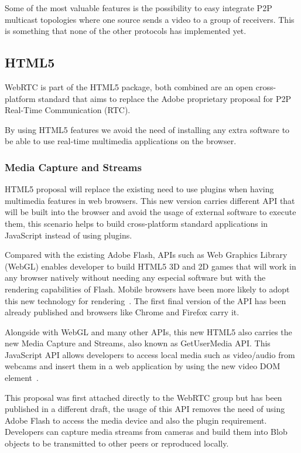 Some of the most valuable features is the possibility to easy integrate P2P multicast topologies where one source sends a video to a group of receivers. This is something that none of the other protocols has implemented yet.

\subsection{HTML5}

WebRTC is part of the HTML5 package, both combined are an open cross-platform standard that aims to replace the Adobe proprietary proposal for P2P Real-Time Communication (RTC).

By using HTML5 features we avoid the need of installing any extra software to be able to use real-time multimedia applications on the browser.

\subsubsection{Media Capture and Streams}

HTML5 proposal will replace the existing need to use plugins when having multimedia features in web browsers. This new version carries different API that will be built into the browser and avoid the usage of external software to execute them, this scenario helps to build cross-platform standard applications in JavaScript instead of using plugins. 

Compared with the existing Adobe Flash, APIs such as Web Graphics Library (WebGL) enables developer to build HTML5 3D and 2D games that will work in any browser natively without needing any especial software but with the rendering capabilities of Flash. Mobile browsers have been more likely to adopt this new technology for rendering~\cite{webglDraft}. The first final version of the API has been already published and browsers like Chrome and Firefox carry it.

Alongside with WebGL and many other APIs, this new HTML5 also carries the new Media Capture and Streams, also known as GetUserMedia API. This JavaScript API allows developers to access local media such as video/audio from webcams and insert them in a web application by using the new video DOM element~\cite{getusermediaDraft}.

This proposal was first attached directly to the WebRTC group but has been published in a different draft, the usage of this API removes the need of using Adobe Flash to access the media device and also the plugin requirement. Developers can capture media streams from cameras and build them into Blob objects to be transmitted to other peers or reproduced locally.

